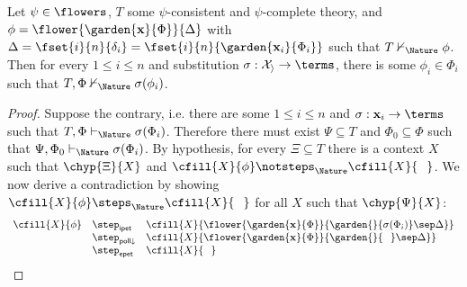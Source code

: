 \begin{proposition}\label{thm:inv-deriv-flower}
  
  Let $\psi \in \flowers$, $T$ some $\psi$-consistent and $\psi$-complete
  theory, and $\phi = \flower{\garden{\mathbf{x}}{\Phi}}{\Delta}$ with $\Delta
  = \fset{i}{n}{\delta_i} = \fset{i}{n}{\garden{\mathbf{x}_i}{\Phi_i}}$ such
  that $T \nvdash_\Nature \phi$. Then for every $1 \leq i \leq n$ and substitution
  $\sigma : \mathcal{X_i} \to \terms$, there is some $\phi_i \in \Phi_i$ such
  that $T, \Phi \nvdash_\Nature \sigma(\phi_i)$.
\end{proposition}
\begin{proof}
  Suppose the contrary, i.e. there are some $1 \leq i \leq n$ and $\sigma :
  \mathbf{x}_i \to \terms$ such that $T, \Phi \vdash_\Nature \sigma(\Phi_i)$. Therefore
  there must exist $\Psi \subseteq T$ and $\Phi_0 \subseteq \Phi$ such that
  $\Psi, \Phi_0 \vdash_\Nature \sigma(\Phi_i)$. By hypothesis, for every $\Xi \subseteq
  T$ there is a context $X$ such that $\chyp{\Xi}{X}$ and $\cfill{X}{\phi}
  \notsteps_\Nature \cfill{X}{\phantom{\Phi}}$. We now derive a contradiction by showing $\cfill{X}{\phi}
  \steps_\Nature \cfill{X}{\phantom{\Phi}}$ for all $X$ such that $\chyp{\Psi}{X}$:
  $$
  \begin{array}{rll}
    \cfill{X}{\phi}
    &\step_{\mathsf{ipet}} &\cfill{X}{\flower{\garden{\mathbf{x}}{\Phi}}{\garden{{}}{\sigma(\Phi_i)} \sep \Delta}} \\
    &\step_{\mathsf{poll}{\downarrow}} &\cfill{X}{\flower{\garden{\mathbf{x}}{\Phi}}{\garden{{}}{\phantom{\Phi}} \sep \Delta}} \\
    &\step_{\mathsf{epet}} &\cfill{X}{\phantom{\Phi}}
  \end{array}
  $$
\end{proof}

